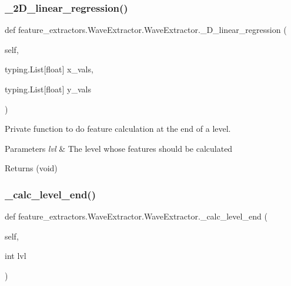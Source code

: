 \subsubsection{\texorpdfstring{\_2D\_linear\_regression()}{\_2D\_linear\_regression()}}
{\footnotesize\ttfamily def feature\+\_\+extractors.\+Wave\+Extractor.\+Wave\+Extractor.\+\_\+D\+\_\+linear\+\_\+regression (\begin{DoxyParamCaption}\item[{}]{self,  }\item[{typing.\+List\mbox{[}float\mbox{]}}]{x\+\_\+vals,  }\item[{typing.\+List\mbox{[}float\mbox{]}}]{y\+\_\+vals }\end{DoxyParamCaption})\hspace{0.3cm}{\ttfamily [private]}}



Private function to do feature calculation at the end of a level. 


\begin{DoxyParams}{Parameters}
{\em lvl} & The level whose features should be calculated \\
\hline
\end{DoxyParams}
\begin{DoxyReturn}{Returns}
(void) 
\end{DoxyReturn}
\mbox{\label{classfeature__extractors_1_1_wave_extractor_1_1_wave_extractor_ab6c939253dae530a4e3b5c13e160e5df}} 
\subsubsection{\texorpdfstring{\_calc\_level\_end()}{\_calc\_level\_end()}}
{\footnotesize\ttfamily def feature\+\_\+extractors.\+Wave\+Extractor.\+Wave\+Extractor.\+\_\+calc\+\_\+level\+\_\+end (\begin{DoxyParamCaption}\item[{}]{self,  }\item[{int}]{lvl }\end{DoxyParamCaption})\hspace{0.3cm}{\ttfamily [private]}}



